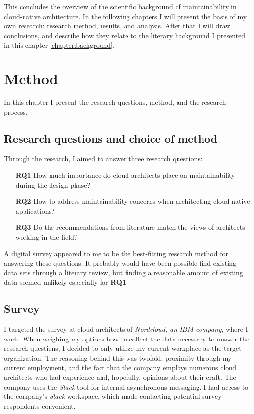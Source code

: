 \documentclass[utf8,english]{gradu3}
\begin{document}
This concludes the overview of the scientific background of maintainability in cloud-native architecture.
In the following chapters I will present the basis of my own research: research method,
results, and analysis. After that I will draw conclusions, and describe how they relate to
the literary background I presented in this chapter \ref{chapter:background}.


\chapter{Method}
\label{chapter:method}

In this chapter I present the research questions, method, and the research process.

\section{Research questions and choice of method}

Through the research, I aimed to answer three research questions:
\begin{itemize}
  \item [\textbf{RQ1}] How much importance do cloud architects place on
        maintainability during the design phase?
  \item [\textbf{RQ2}] How to address maintainability concerns when architecting
        cloud-native applications?
  \item [\textbf{RQ3}] Do the recommendations from literature match the views of
        architects working in the field?
\end{itemize}

A digital survey appeared to me to be the best-fitting research method for
answering these questions.  It probably would have been possible find existing
data sets through a literary review, but finding a reasonable amount of existing
data seemed unlikely especially for \textbf{RQ1}.

\section{Survey}

I targeted the survey at cloud architects of \textit{Nordcloud, an IBM company},
where I work.  When weighing my options how to collect the data necessary to
answer the research questions, I decided to only utilize my current workplace as
the target organization.  The reasoning behind this was twofold: proximity
through my current employment, and the fact that the company employs numerous
cloud architects who had experience and, hopefully, opinions about their craft.
The company uses the \textit{Slack} tool for internal asynchronous messaging.  I
had access to the company's \textit{Slack} workspace, which made contacting
potential survey respondents convenient.
\end{document}
